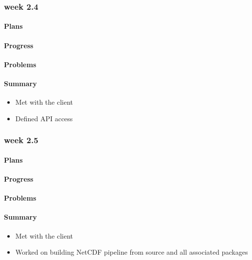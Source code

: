 \documentclass[onecolumn, draftclsnofoot,10pt, compsoc]{article}
\begin{document}
		\subsubsection{week 2.4}
			\paragraph{Plans} \hfill \break

			\paragraph{Progress} \hfill \break

			\paragraph{Problems} \hfill \break

			\paragraph{Summary} \hfill \break
				\begin{itemize}
                    \item Met with the client
                    \item Defined API access
                \end{itemize}
                
		\subsubsection{week 2.5}
			\paragraph{Plans} \hfill \break

			\paragraph{Progress} \hfill \break

			\paragraph{Problems} \hfill \break

			\paragraph{Summary} \hfill \break
				\begin{itemize}
                    \item Met with the client
                    \item Worked on building NetCDF pipeline from source and all associated packages 
                \end{itemize}
\end{document}
